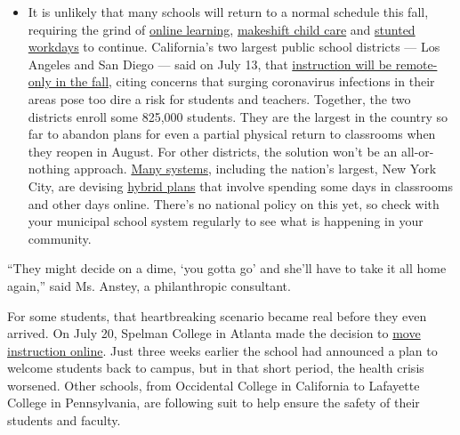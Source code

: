 \begin{itemize}
  \begin{itemize}
  \tightlist
  \item
    It is unlikely that many schools will return to a normal schedule
    this fall, requiring the grind of
    \href{https://www.nytimes.com/2020/06/05/us/coronavirus-education-lost-learning.html?action=click\&pgtype=Article\&state=default\&region=MAIN_CONTENT_3\&context=storylines_faq}{online
    learning},
    \href{https://www.nytimes.com/2020/05/29/us/coronavirus-child-care-centers.html?action=click\&pgtype=Article\&state=default\&region=MAIN_CONTENT_3\&context=storylines_faq}{makeshift
    child care} and
    \href{https://www.nytimes.com/2020/06/03/business/economy/coronavirus-working-women.html?action=click\&pgtype=Article\&state=default\&region=MAIN_CONTENT_3\&context=storylines_faq}{stunted
    workdays} to continue. California's two largest public school
    districts --- Los Angeles and San Diego --- said on July 13, that
    \href{https://www.nytimes.com/2020/07/13/us/lausd-san-diego-school-reopening.html?action=click\&pgtype=Article\&state=default\&region=MAIN_CONTENT_3\&context=storylines_faq}{instruction
    will be remote-only in the fall}, citing concerns that surging
    coronavirus infections in their areas pose too dire a risk for
    students and teachers. Together, the two districts enroll some
    825,000 students. They are the largest in the country so far to
    abandon plans for even a partial physical return to classrooms when
    they reopen in August. For other districts, the solution won't be an
    all-or-nothing approach.
    \href{https://bioethics.jhu.edu/research-and-outreach/projects/eschool-initiative/school-policy-tracker/}{Many
    systems}, including the nation's largest, New York City, are
    devising
    \href{https://www.nytimes.com/2020/06/26/us/coronavirus-schools-reopen-fall.html?action=click\&pgtype=Article\&state=default\&region=MAIN_CONTENT_3\&context=storylines_faq}{hybrid
    plans} that involve spending some days in classrooms and other days
    online. There's no national policy on this yet, so check with your
    municipal school system regularly to see what is happening in your
    community.
  \end{itemize}
\end{itemize}

``They might decide on a dime, `you gotta go' and she'll have to take it
all home again,'' said Ms. Anstey, a philanthropic consultant.

For some students, that heartbreaking scenario became real before they
even arrived. On July 20, Spelman College in Atlanta made the decision
to \href{https://www.spelman.edu/academics/path-forward-2020-21}{move
instruction online}. Just three weeks earlier the school had announced a
plan to welcome students back to campus, but in that short period, the
health crisis worsened. Other schools, from Occidental College in
California to Lafayette College in Pennsylvania, are following suit to
help ensure the safety of their students and faculty.

